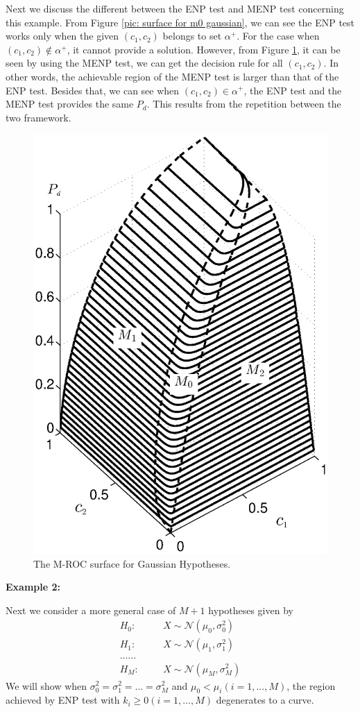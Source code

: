 Next we discuss the different between the ENP test and MENP test concerning this example. 
From Figure \ref{pic: surface for m0 gaussian}, we can see the ENP test works only when the given $(c_1, c_2)$ belongs to set $\alpha^+$. For the case when $(c_1, c_2) \notin \alpha^+$, it cannot provide a solution.  However,  from Figure \ref{pic: LJS}, it can be seen by using the MENP test, we can get the decision rule for all $(c_1, c_2)$. 
In other words, the achievable region of the MENP test is larger than that of the ENP test. 
Besides that, we can see when $(c_1, c_2) \in \alpha^+$, the ENP test and the MENP test provides the same $P_d$. This results from the repetition between the two framework.  
\begin{figure}[!t]
\centering
\includegraphics[width=12cm, height=16cm]{3/ROC2.eps}
\caption{The M-ROC surface for Gaussian Hypotheses.}
\label{pic: LJS}
\end{figure}

\noindent \textbf{Example 2:}

Next we consider a more general case of $M+1$ hypotheses given by 
\begin{equation}
\label{equ: m+1 Gaussian Hypo}
\begin{split}
H_0:\;\;\;\;\;\;&X\sim \mathcal{N}(\mu_0, \sigma_0^2)\\
H_1:\;\;\;\;\;\;&X\sim \mathcal{N}(\mu_1, \sigma_1^2)\\
  ......\\
H_M:\;\;\;\;\;\;&X\sim \mathcal{N}(\mu_M, \sigma_M^2)
\end{split}
\end{equation}
We will show when $\sigma_0^2 = \sigma_1^2 = ... = \sigma_M^2$ and $\mu_0 < \mu_i (i = 1, ..., M)$, the region achieved by ENP test with $k_i \geq 0 (i = 1, ..., M)$ degenerates to a curve.

